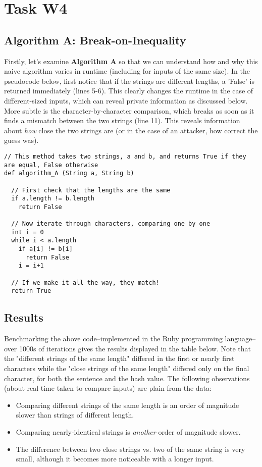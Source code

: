 \documentclass{article}
\providecommand{\tightlist}{
    \setlength{\itemsep}{0pt}\setlength{\parskip}{0pt}
}
\begin{document}
\section{Task W4}
\subsection{Algorithm A: Break-on-Inequality}
Firstly, let's examine \textbf{Algorithm A} so that we can understand how and why this naive algorithm varies in runtime (including for inputs of the same size).
In the pseudocode below, first notice that if the strings are different lengths, a 'False' is returned immediately (lines 5-6).
This clearly changes the runtime in the case of different-sized inputs, which can reveal private information as discussed below.
More subtle is the character-by-character comparison, which breaks as soon as it finds a mismatch between the two strings (line 11). This reveals information about \textit{how} close the two strings are (or in the case of an attacker, how correct the guess was).

\begin{lstlisting}
// This method takes two strings, a and b, and returns True if they are equal, False otherwise
def algorithm_A (String a, String b)

  // First check that the lengths are the same
  if a.length != b.length
    return False

  // Now iterate through characters, comparing one by one
  int i = 0
  while i < a.length
    if a[i] != b[i]
      return False
    i = i+1

  // If we make it all the way, they match!
  return True
\end{lstlisting}


\subsection{Results}
Benchmarking \cite{benchmark} the above code--implemented in the Ruby programming language--over 1000s of iterations gives the results displayed in the table below. Note that the "different strings of the same length" differed in the first or nearly first characters while the "close strings of the same length" differed only on the final character, for both the sentence and the hash value. The following observations (about real time taken to compare inputs) are plain from the data:
\begin{itemize}\tightlist
  \item Comparing different strings of the same length is an order of magnitude slower than strings of different length.
  \item Comparing nearly-identical strings is \textit{another} order of magnitude slower.
  \item The difference between two close strings vs. two of the same string is very small, although it becomes more noticeable with a longer input.
\end{itemize}
\end{document}
